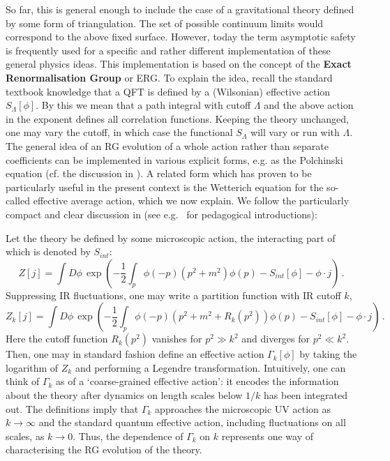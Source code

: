 \documentclass[12pt]{article}
\newcommand{\be}{\begin{equation}}
\newcommand{\ee}{\end{equation}}
\numberwithin{equation}{section}
\begin{document}
So far, this is general enough to include the case of a gravitational theory defined by some form of triangulation. The set of possible continuum limits would correspond to the above fixed surface. However, today the term asymptotic safety is frequently used for a specific and rather different implementation of these general physics ideas. This implementation is based on the concept of the {\bf Exact Renormalisation Group} or ERG. To explain the idea, recall the standard textbook knowledge that a QFT is defined by a (Wilsonian) effective action $S_\Lambda[\phi]$. By this we mean that a path integral with cutoff $\Lambda$ and the above action in the exponent defines all correlation functions. Keeping the theory unchanged, one may vary the cutoff, in which case the functional $S_\Lambda$ will vary or run with $\Lambda$. The general idea of an RG evolution of a whole action rather than separate coefficients can be implemented in various explicit forms, e.g. as the Polchinski equation \cite{Polchinski:1983gv} (cf. the discussion in \cite{Ellwanger:1993mw, Morris:1993qb}). A related form which has proven to be particularly useful in the present context is the Wetterich equation \cite{Wetterich:1992yh} for the so-called effective average action, which we now explain. We follow the particularly compact and clear discussion in \cite{Litim:2008tt} (see e.g.~\cite{Reuter:2019byg, Reuter:2012id, Niedermaier:2006ns} for pedagogical introductions):

Let the theory be defined by some microscopic action, the interacting part of which is denoted by $S_{int}$:
\be
Z[j]=\int D\phi\,\exp\left(-\frac{1}{2}\int_p \phi(-p)(p^2+m^2)\phi(p)-S_{int}[\phi] - \phi\cdot j\right)\,.
\ee
Suppressing IR fluctuations, one may write a partition function with IR cutoff $k$,
\be
Z_k[j]=\int D\phi\,\exp\left(-\frac{1}{2}\int_p \phi(-p)(p^2+m^2+R_k(p^2))\phi(p)-S_{int}[\phi] - \phi\cdot j\right)\,.
\ee
Here the cutoff function $R_k(p^2)$ vanishes for $p^2\gg k^2$ and diverges for $p^2\ll k^2$. Then, one may in standard fashion define an effective action $\Gamma_k[\phi]$ by taking the logarithm of $Z_k$ and performing a Legendre transformation. Intuitively, one can think of $\Gamma_k$ as of a `coarse-grained effective action': it encodes the information about the theory after dynamics on length scales below $1/k$ has been integrated out. The definitions imply that $\Gamma_k$ approaches the microscopic UV action as $k\to \infty$ and the standard quantum effective action, including fluctuations on all scales, as $k\to 0$. Thus, the dependence of $\Gamma_k$ on $k$ represents one way of characterising the RG evolution of the theory. 
\end{document}
